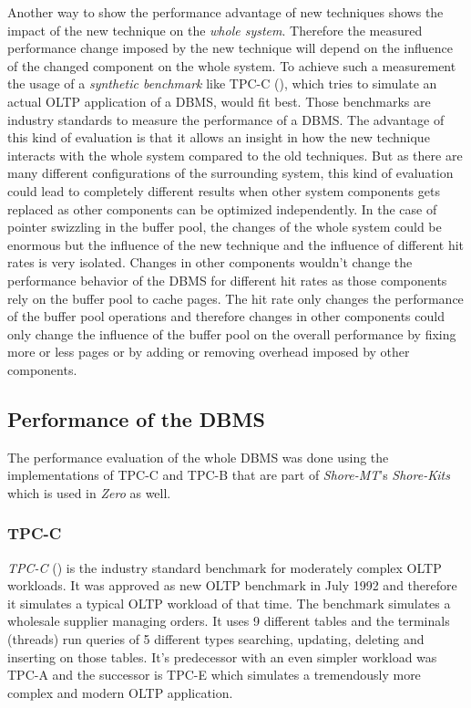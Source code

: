 	Another way to show the performance advantage of new techniques shows the impact of the new technique on the \emph{whole system}. Therefore the measured performance change imposed by the new technique will depend on the influence of the changed component on the whole system. To achieve such a measurement the usage of a \emph{synthetic benchmark} like TPC-C (\cite{TPC-C}), which tries to simulate an actual OLTP application of a DBMS, would fit best. Those benchmarks are industry standards to measure the performance of a DBMS. The advantage of this kind of evaluation is that it allows an insight in how the new technique interacts with the whole system compared to the old techniques. But as there are many different configurations of the surrounding system, this kind of evaluation could lead to completely different results when other system components gets replaced as other components can be optimized independently. In the case of pointer swizzling in the buffer pool, the changes of the whole system could be enormous but the influence of the new technique and the influence of different hit rates is very isolated. Changes in other components wouldn't change the performance behavior of the DBMS for different hit rates as those components rely on the buffer pool to cache pages. The hit rate only changes the performance of the buffer pool operations and therefore changes in other components could only change the influence of the buffer pool on the overall performance by fixing more or less pages or by adding or removing overhead imposed by other components.
	
\subsection{Performance of the DBMS}

	The performance evaluation of the whole DBMS was done using the implementations of TPC-C and TPC-B that are part of \emph{Shore-MT}'s \emph{Shore-Kits} which is used in \emph{Zero} as well. 	

\subsubsection{TPC-C} \label{subsub:tpcc}

	\emph{TPC-C} (\cite{TPC-C}) is the industry standard benchmark for moderately complex OLTP workloads. It was approved as new OLTP benchmark in July 1992 and therefore it simulates a typical OLTP workload of that time. The benchmark simulates a wholesale supplier managing orders. It uses 9 different tables and the terminals (threads) run queries of 5 different types searching, updating, deleting and inserting on those tables. It's predecessor with an even simpler workload was TPC-A and the successor is TPC-E which simulates a tremendously more complex and modern OLTP application.
	
